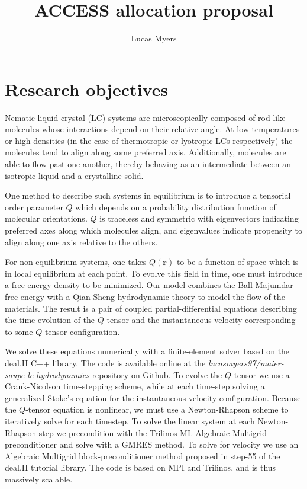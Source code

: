 \documentclass[reqno]{article}
\begin{document}
\title{ACCESS allocation proposal}
\author{Lucas Myers}
\maketitle

\section{Research objectives}
Nematic liquid crystal (LC) systems are microscopically composed of rod-like molecules whose interactions depend on their relative angle.
At low temperatures or high densities (in the case of thermotropic or lyotropic LCs respectively) the molecules tend to align along some preferred axis. 
Additionally, molecules are able to flow past one another, thereby behaving as an intermediate between an isotropic liquid and a crystalline solid. 

One method to describe such systems in equilibrium is to introduce a tensorial order parameter $Q$ which depends on  a probability distribution function of molecular orientations.
$Q$ is traceless and symmetric with eigenvectors indicating preferred axes along which molecules align, and eigenvalues indicate propensity to align along one axis relative to the others. 

For non-equilibrium systems, one takes $Q(\mathbf{r})$ to be a function of space which is in local equilibrium at each point.
To evolve this field in time, one must introduce a free energy density to be minimized.
Our model combines the Ball-Majumdar free energy with a Qian-Sheng hydrodynamic theory to model the flow of the materials.
The result is a pair of coupled partial-differential equations describing the time evolution of the $Q$-tensor and the instantaneous velocity corresponding to some $Q$-tensor configuration. 

We solve these equations numerically with a finite-element solver based on the deal.II C++ library.
The code is available online at the \textit{lucasmyers97/maier-saupe-lc-hydrodynamics} repository on Github.
To evolve the $Q$-tensor we use a Crank-Nicolson time-stepping scheme, while at each time-step solving a generalized Stoke's equation for the instantaneous velocity configuration.
Because the $Q$-tensor equation is nonlinear, we must use a Newton-Rhapson scheme to iteratively solve for each timestep.
To solve the linear system at each Newton-Rhapson step we precondition with the Trilinos ML Algebraic Multigrid preconditioner and solve with a GMRES method.
To solve for velocity we use an Algebraic Multigrid block-preconditioner method proposed in step-55 of the deal.II tutorial library. 
The code is based on MPI and Trilinos, and is thus massively scalable. 
\end{document}
